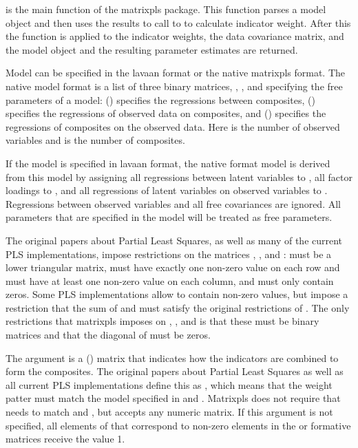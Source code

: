 \documentclass[a4paper]{book}
\begin{document}
%
\begin{Details}\relax
{} is the main function of the matrixpls package. This function
parses a model object and then uses the results to call  to
to calculate indicator weight. After this the  function is
applied to the indicator weights, the data covariance matrix,
and the model object and the resulting parameter estimates are returned.

Model can be specified in the lavaan format or the native matrixpls format.
The native model format is a list of three binary matrices, , ,
and  specifying the free parameters of a model:  () specifies the 
regressions between composites,  () specifies the regressions of observed
data on composites, and  () specifies the regressions of composites on the
observed data. Here  is the number of observed variables and  is the number of composites.

If the model is specified in lavaan format, the native
format model is derived from this model by assigning all regressions between latent
variables to , all factor loadings to , and all regressions
of latent variables on observed variables to . Regressions between
observed variables and all free covariances are ignored. All parameters that are
specified in the model will be treated as free parameters.

The original papers about Partial Least Squares, as well as many of the current PLS
implementations, impose restrictions on the matrices ,
, and :  must be a lower triangular matrix,
 must have exactly one non-zero value on each row and must have at least
one non-zero value on each column, and  must only contain zeros.
Some PLS implementations allow  to contain non-zero values, but impose a
restriction that the sum of  and  must satisfy
the original restrictions of . The only restrictions that matrixpls
imposes on , , and  is that these must be
binary matrices and that the diagonal of  must be zeros.

The argument  is a () matrix that indicates
how the indicators are combined to form the composites. The original papers about
Partial Least Squares as well as all current PLS implementations define this as
, which means that the weight patter must match the
model specified in  and . Matrixpls does not
require that  needs to match  and , but
accepts any numeric matrix. If this argument is not specified, all elements of  that
correspond to non-zero elements in the  or  formative
matrices receive the value 1.
\end{Details}
\end{document}
